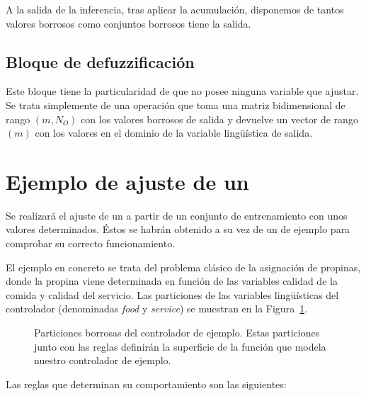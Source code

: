 A la salida de la inferencia, tras aplicar la acumulación, disponemos de tantos valores borrosos como conjuntos borrosos tiene la salida.

\subsection{Bloque de defuzzificación}

Este bloque tiene la particularidad de que no posee ninguna variable que ajustar. Se trata simplemente de una operación que toma una matriz bidimensional de rango $(m, N_O)$ con los valores borrosos de salida y devuelve un vector de rango $(m)$ con los valores en el dominio de la variable lingüística de salida.

\section{Ejemplo de ajuste de un }

Se realizará el ajuste de un  a partir de un conjunto de entrenamiento con unos valores determinados. Éstos se habrán obtenido a su vez de un  de ejemplo para comprobar su correcto funcionamiento.

El ejemplo en concreto se trata del problema clásico de la asignación de propinas, donde la propina viene determinada en función de las variables calidad de la comida y calidad del servicio. Las particiones de las variables lingüísticas del controlador (denominadas \textit{food} y \textit{service}) se muestran en la Figura~\ref{fig:real-tip-controller-vars}.

\begin{figure}
	\centering
	\qquad
	\caption[Particiones borrosas del controlador de ejemplo]{Particiones borrosas del controlador de ejemplo. Estas particiones junto con las reglas definirán la superficie de la función que modela nuestro controlador de ejemplo.}
	\label{fig:real-tip-controller-vars}
\end{figure}

Las reglas que determinan su comportamiento son las siguientes:

